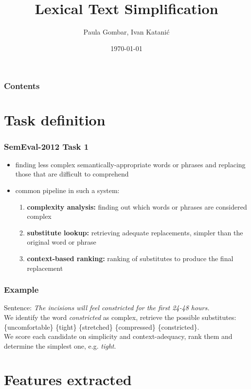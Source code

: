 \documentclass[utf8]{beamer}
\title{Lexical Text Simplification}
\author{Paula Gombar, Ivan Katanić}
\institute{FER}
\date{\today}
\begin{document}
\begin{frame}
\titlepage
\end{frame}

\begin{frame}
\frametitle{Contents}
\tableofcontents
\end{frame}

\section{Task definition}

\begin{frame}
\frametitle{SemEval-2012 Task 1}
\begin{itemize}
 \item finding less complex semantically-appropriate words or phrases and replacing those that are difficult to comprehend
  \item common pipeline in such a system:
  \begin{enumerate}
    \item \textbf{complexity analysis:} finding out which words or phrases are considered complex
    \item \textbf{substitute lookup:} retrieving adequate replacements, simpler than the original word or phrase
    \item \textbf{context-based ranking:} ranking of substitutes to produce the final replacement
  \end{enumerate}
\end{itemize}
\end{frame}

\begin{frame}
\frametitle{Example}
Sentence: \textit{The incisions will feel constricted for the first 24-48 hours.} \\
We identify the word \textit{constricted} as complex, retrieve the possible substitutes: \\
\{uncomfortable\} \{tight\} \{stretched\} \{compressed\} \{constricted\}. \\
We score each candidate on simplicity and context-adequacy, rank them and determine the simplest one, e.g. \textit{tight}.
\end{frame}

\section{Features extracted}
\end{document}
